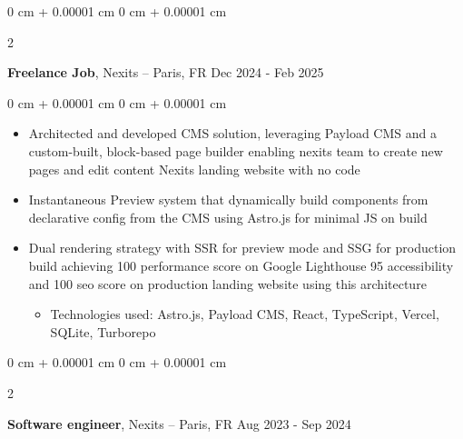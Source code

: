 \documentclass[10pt, letterpaper]{article}
\newenvironment{highlights}{
  \begin{itemize}[
    topsep=0.10 cm,
    parsep=0.10 cm,
    partopsep=0pt,
    itemsep=0pt,
    leftmargin=0 cm + 10pt
    ]
  }{
\end{itemize}
}
\newenvironment{highlightsforbulletentries}{
  \begin{itemize}[
    topsep=0.10 cm,
    parsep=0.10 cm,
    partopsep=0pt,
    itemsep=0pt,
    leftmargin=10pt
    ]
  }{
\end{itemize}
} %
\newenvironment{onecolentry}{
  \begin{adjustwidth}{
      0 cm + 0.00001 cm
    }{
      0 cm + 0.00001 cm
    }
  }{
  \end{adjustwidth}
} %
\newenvironment{twocolentry}[2][]{
  \onecolentry
  \def\secondColumn{#2}
  \setcolumnwidth{\fill, 4.5 cm}
  \begin{paracol}{2}
  }{
    \switchcolumn \raggedleft \secondColumn
  \end{paracol}
  \end{onecolentry}
} %
\begin{document}
  \vspace{0.2 cm}

  \begin{twocolentry}{
      Dec 2024 - Feb 2025
    }
  \textbf{Freelance Job}, Nexits  -- Paris, FR\end{twocolentry}

  \vspace{0.10 cm}
  \begin{onecolentry}
    \begin{highlights}
    \item Architected and developed CMS solution,
      leveraging Payload CMS and a custom-built, block-based page builder enabling nexits team to create new pages and edit content Nexits landing website with no code
    \item 
      Instantaneous Preview system that dynamically build components from declarative config from the CMS using Astro.js for minimal JS on build
    \item Dual rendering strategy with SSR for preview mode and SSG for production build achieving 100 performance score on Google Lighthouse 95 accessibility and 100 seo score on production landing website using this architecture 

          \begin{highlightsforbulletentries}
    \item Technologies used: Astro.js, Payload CMS, React, TypeScript, Vercel, SQLite, Turborepo
    \end{highlightsforbulletentries}

    \end{highlights}

  \end{onecolentry}




  \begin{twocolentry}{
      Aug 2023 - Sep 2024
    }
  \textbf{Software engineer}, Nexits  -- Paris, FR\end{twocolentry}
\end{document}
